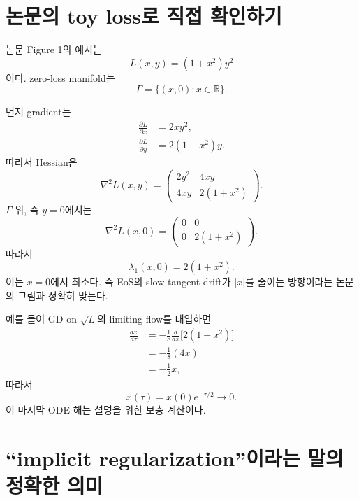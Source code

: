 \documentclass[11pt,a4paper,oneside,openany]{memoir}
\newcommand{\R}{\mathbb{R}}
\newcommand{\Hess}{\nabla^2}
\theoremstyle{definition}
\begin{document}
\section{논문의 toy loss로 직접 확인하기}

논문 Figure 1의 예시는
\begin{equation}
  L(x,y)=(1+x^2)y^2
\end{equation}
이다. zero-loss manifold는
\begin{equation}
  \Gamma=\{(x,0):x\in\R\}.
\end{equation}

\begin{suppbox}
먼저 gradient는
\begin{align}
  \frac{\partial L}{\partial x}&=2xy^2,\\
  \frac{\partial L}{\partial y}&=2(1+x^2)y.
\end{align}
따라서 Hessian은
\begin{equation}
  \Hess L(x,y)
  =\begin{pmatrix}
  2y^2 & 4xy\\
  4xy & 2(1+x^2)
  \end{pmatrix}.
\end{equation}
$\Gamma$ 위, 즉 $y=0$에서는
\begin{equation}
  \Hess L(x,0)
  =\begin{pmatrix}
  0&0\\
  0&2(1+x^2)
  \end{pmatrix}.
\end{equation}
따라서
\begin{equation}
  \lambda_1(x,0)=2(1+x^2).
\end{equation}
이는 $x=0$에서 최소다. 즉 EoS의 slow tangent drift가 $|x|$를 줄이는 방향이라는 논문의 그림과 정확히 맞는다.

예를 들어 GD on $\sqrt L$의 limiting flow를 대입하면
\begin{align}
  \frac{dx}{d\tau}
  &=-\frac18\frac{d}{dx}\bigl[2(1+x^2)\bigr]\\
  &=-\frac18(4x)\\
  &=-\frac12x,
\end{align}
따라서
\begin{equation}
  x(\tau)=x(0)e^{-\tau/2}\to0.
\end{equation}
이 마지막 ODE 해는 설명을 위한 보충 계산이다.
\end{suppbox}

\section{``implicit regularization''이라는 말의 정확한 의미}
\end{document}
